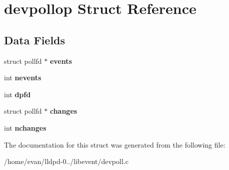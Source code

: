 \section{devpollop \-Struct \-Reference}
\label{structdevpollop}
\subsection*{\-Data \-Fields}
\begin{DoxyCompactItemize}
\item 
struct pollfd $\ast$ {\bfseries events}\label{structdevpollop_ad9db1e0be6fbf2cfe8aadd4921e5b1b4}

\item 
int {\bfseries nevents}\label{structdevpollop_a5209ed8d981dc170e77bea159c5bbe48}

\item 
int {\bfseries dpfd}\label{structdevpollop_a9d6a39d7f07ebb70a570c8518733fbb6}

\item 
struct pollfd $\ast$ {\bfseries changes}\label{structdevpollop_afc65ce04e66f701a4a92e13c529320ed}

\item 
int {\bfseries nchanges}\label{structdevpollop_a43cf821e8f4411a0b97e3c7a4f930d5b}

\end{DoxyCompactItemize}


\-The documentation for this struct was generated from the following file\-:\begin{DoxyCompactItemize}
\item 
/home/evan/lldpd-\/0../libevent/devpoll.\-c\end{DoxyCompactItemize}

